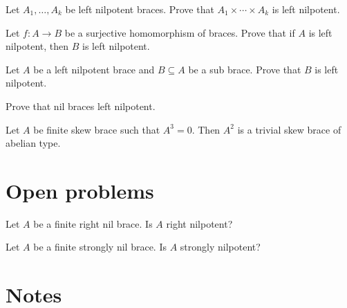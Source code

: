 \begin{prob}
    \label{prob:LN_direct}
    Let $A_1,\dots,A_k$ be left nilpotent braces. Prove that 
    $A_1\times\cdots\times A_k$ is left nilpotent.
\end{prob}

\begin{prob}
    \label{prob:LN_surj}
     Let $f\colon A\to B$ be a surjective homomorphism of braces. Prove that 
     if $A$ is left nilpotent, then $B$ is left nilpotent.
\end{prob}

\begin{prob}
    \label{prob:LN_sub}
    Let $A$ be a left nilpotent brace and $B\subseteq A$ be a sub brace. 
    Prove that $B$ is left nilpotent.
\end{prob}

\begin{prob}
    \label{prob:nil=>leftnilpotent}
    Prove that nil braces  left nilpotent. 
\end{prob}

\begin{prob}
    Let $A$ be finite skew brace such that $A^3=0$. Then 
    $A^2$ is a trivial skew brace of abelian type.
\end{prob}



\section*{Open problems}

\begin{problem}
    \label{question:rightnil=>rightnilp}
    Let $A$ be a finite right nil brace.  Is $A$ right
    nilpotent?
\end{problem}

\begin{problem}
    \label{question:stronglynil=>stronglynilp}
    Let $A$ be a finite strongly nil brace.
    Is $A$ strongly nilpotent?
\end{problem}

\section*{Notes}

